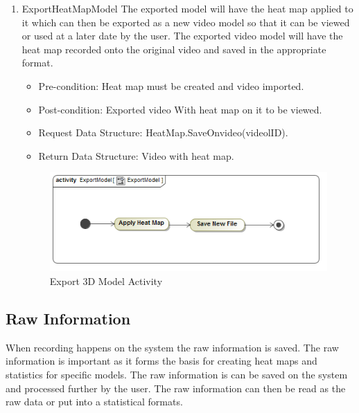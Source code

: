 \begin{enumerate}
			
			
			\item{ExportHeatMapModel}
			The exported model will have the heat map applied to it which can then be exported as a new video model so that it can be viewed or used at a later date by the user. The exported video model will have the heat map recorded onto the original video and saved in the appropriate format.
			\begin{itemize}
				\item Pre-condition: Heat map must be created and video imported.
				\item Post-condition: Exported video With heat map on it to be viewed.
				\item Request Data Structure: HeatMap.SaveOnvideo(videolID).
				\item Return Data Structure: Video with heat map.
			\end{itemize}
		\begin{figure}[!ht]
			\centering
			\includegraphics[scale=0.5]{Diagrams/Activity_Diagram__ExportModel__ExportModel.png}
			\caption{Export 3D Model Activity}
		\end{figure}
	
		\end{enumerate}
		
\subsection{Raw Information}
When recording happens on the system the raw information is saved. The raw information is important as it forms the basis for creating heat maps and statistics for specific models. The raw information is can be saved on the system and processed further by the user. The raw information can then be read as the raw data or put into a statistical formats.
\newline

